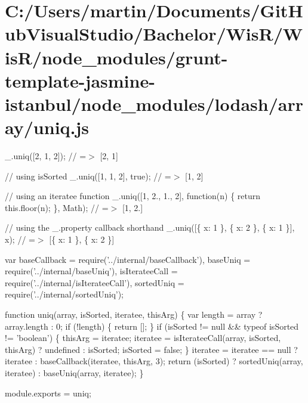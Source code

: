 \hypertarget{_c_1_2_users_2martin_2_documents_2_git_hub_visual_studio_2_bachelor_2_wis_r_2_wis_r_2node_modulef0dc6bc52ffa11e6f21b0ddb9890f3a2}{}\section{C\+:/\+Users/martin/\+Documents/\+Git\+Hub\+Visual\+Studio/\+Bachelor/\+Wis\+R/\+Wis\+R/node\+\_\+modules/grunt-\/template-\/jasmine-\/istanbul/node\+\_\+modules/lodash/array/uniq.\+js}
\+\_\+.\+uniq(\mbox{[}2, 1, 2\mbox{]}); // =$>$ \mbox{[}2, 1\mbox{]}

// using {\ttfamily is\+Sorted} \+\_\+.\+uniq(\mbox{[}1, 1, 2\mbox{]}, true); // =$>$ \mbox{[}1, 2\mbox{]}

// using an iteratee function \+\_\+.\+uniq(\mbox{[}1, 2., 1., 2\mbox{]}, function(n) \{ return this.\+floor(n); \}, Math); // =$>$ \mbox{[}1, 2.\mbox{]}

// using the {\ttfamily \+\_\+.\+property} callback shorthand \+\_\+.\+uniq(\mbox{[}\{ \textquotesingle{}x\textquotesingle{}\+: 1 \}, \{ \textquotesingle{}x\textquotesingle{}\+: 2 \}, \{ \textquotesingle{}x\textquotesingle{}\+: 1 \}\mbox{]}, \textquotesingle{}x\textquotesingle{}); // =$>$ \mbox{[}\{ \textquotesingle{}x\textquotesingle{}\+: 1 \}, \{ \textquotesingle{}x\textquotesingle{}\+: 2 \}\mbox{]}


\begin{DoxyCodeInclude}
var baseCallback = require(\textcolor{stringliteral}{'../internal/baseCallback'}),
    baseUniq = require(\textcolor{stringliteral}{'../internal/baseUniq'}),
    isIterateeCall = require(\textcolor{stringliteral}{'../internal/isIterateeCall'}),
    sortedUniq = require(\textcolor{stringliteral}{'../internal/sortedUniq'});

\textcolor{keyword}{function} uniq(array, isSorted, iteratee, thisArg) \{
  var length = array ? array.length : 0;
  \textcolor{keywordflow}{if} (!length) \{
    \textcolor{keywordflow}{return} [];
  \}
  \textcolor{keywordflow}{if} (isSorted != null && typeof isSorted != \textcolor{stringliteral}{'boolean'}) \{
    thisArg = iteratee;
    iteratee = isIterateeCall(array, isSorted, thisArg) ? undefined : isSorted;
    isSorted = \textcolor{keyword}{false};
  \}
  iteratee = iteratee == null ? iteratee : baseCallback(iteratee, thisArg, 3);
  \textcolor{keywordflow}{return} (isSorted)
    ? sortedUniq(array, iteratee)
    : baseUniq(array, iteratee);
\}

module.exports = uniq;
\end{DoxyCodeInclude}
 